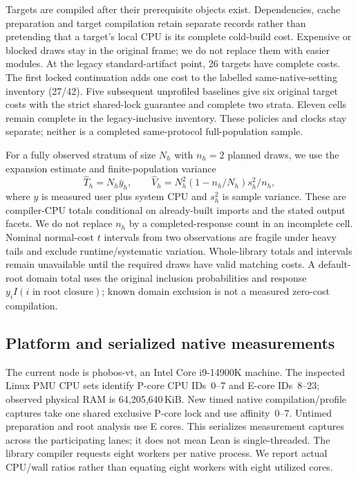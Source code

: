 \documentclass[10pt,twocolumn]{article}
\begin{document}
Targets are compiled after their prerequisite objects exist.
Dependencies, cache preparation and target compilation retain separate
records rather than pretending that a target's local CPU is its complete
cold-build cost. Expensive or blocked draws stay in the original frame;
we do not replace them with easier modules.
At the legacy standard-artifact point, 26 targets have complete costs.
The first locked continuation adds one cost to the labelled
same-native-setting inventory (27/42). Five subsequent unprofiled baselines
give six original target costs with the strict shared-lock guarantee and
complete two strata. Eleven cells remain complete in the legacy-inclusive
inventory. These policies and clocks stay separate; neither is a completed
same-protocol full-population sample.

For a fully observed stratum of size $N_h$ with $n_h=2$ planned draws,
we use the expansion estimate and finite-population variance
\[
 \widehat T_h=N_h\bar y_h,\qquad
 \widehat V_h=N_h^2(1-n_h/N_h)s_h^2/n_h ,
\]
where $y$ is measured user plus system CPU and $s_h^2$ is sample variance.
These are compiler-CPU totals conditional on already-built imports and
the stated output facets. We do not replace $n_h$ by a completed-response
count in an incomplete cell.
Nominal normal-cost $t$ intervals from two observations are fragile under
heavy tails and exclude runtime/systematic variation.
Whole-library totals and intervals remain unavailable until the required
draws have valid matching costs.
A default-root domain total uses the original inclusion probabilities and
response $y_i I(i\text{ in root closure})$; known domain exclusion is not a
measured zero-cost compilation.

\subsection{Platform and serialized native measurements}
The current node is phobos-vt, an Intel Core i9-14900K machine.
The inspected Linux PMU CPU sets identify P-core CPU IDs~0--7 and
E-core IDs~8--23; observed physical RAM is 64,205,640\,KiB.
New timed native compilation/profile captures take one shared exclusive
P-core lock and use affinity~0--7. Untimed preparation and root analysis
use E cores. This serializes measurement captures across the participating
lanes; it does not mean Lean is single-threaded.
The library compiler requests eight workers per native process.
We report actual CPU/wall ratios rather than equating eight workers with
eight utilized cores.
\end{document}
